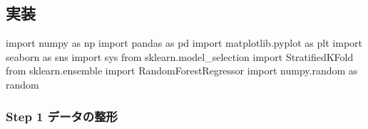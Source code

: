 \documentclass[11pt]{jsarticle}
\newenvironment{Shaded}{}{}
\newcommand{\NormalTok}[1]{{#1}}
\newcommand{\ImportTok}[1]{{#1}}
\begin{document}
    \subsection{実装}\label{ux5b9fux88c5}

    \begin{Shaded}
\begin{Highlighting}[]
\ImportTok{import}\NormalTok{ numpy }\ImportTok{as}\NormalTok{ np}
\ImportTok{import}\NormalTok{ pandas }\ImportTok{as}\NormalTok{ pd}
\ImportTok{import}\NormalTok{ matplotlib.pyplot }\ImportTok{as}\NormalTok{ plt}
\ImportTok{import}\NormalTok{ seaborn }\ImportTok{as}\NormalTok{ sns}
\ImportTok{import}\NormalTok{ sys}
\ImportTok{from}\NormalTok{ sklearn.model_selection }\ImportTok{import}\NormalTok{ StratifiedKFold}
\ImportTok{from}\NormalTok{ sklearn.ensemble }\ImportTok{import}\NormalTok{ RandomForestRegressor}
\ImportTok{import}\NormalTok{ numpy.random }\ImportTok{as}\NormalTok{ random}
\end{Highlighting}
\end{Shaded}

    \subsubsection{Step 1
データの整形}\label{step-1-ux30c7ux30fcux30bfux306eux6574ux5f62}
\end{document}
